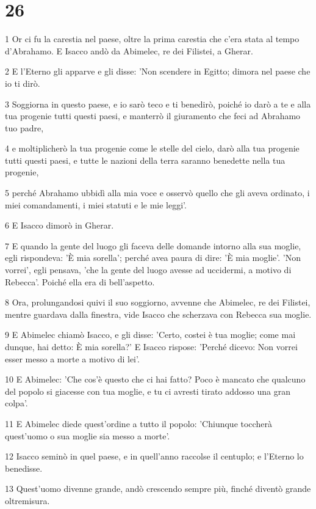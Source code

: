 \chapter{26}

\par 1 Or ci fu la carestia nel paese, oltre la prima carestia che c'era stata al tempo d'Abrahamo. E Isacco andò da Abimelec, re dei Filistei, a Gherar.
\par 2 E l'Eterno gli apparve e gli disse: 'Non scendere in Egitto; dimora nel paese che io ti dirò.
\par 3 Soggiorna in questo paese, e io sarò teco e ti benedirò, poiché io darò a te e alla tua progenie tutti questi paesi, e manterrò il giuramento che feci ad Abrahamo tuo padre,
\par 4 e moltiplicherò la tua progenie come le stelle del cielo, darò alla tua progenie tutti questi paesi, e tutte le nazioni della terra saranno benedette nella tua progenie,
\par 5 perché Abrahamo ubbidì alla mia voce e osservò quello che gli aveva ordinato, i miei comandamenti, i miei statuti e le mie leggi'.
\par 6 E Isacco dimorò in Gherar.
\par 7 E quando la gente del luogo gli faceva delle domande intorno alla sua moglie, egli rispondeva: 'È mia sorella'; perché avea paura di dire: 'È mia moglie'. 'Non vorrei', egli pensava, 'che la gente del luogo avesse ad uccidermi, a motivo di Rebecca'. Poiché ella era di bell'aspetto.
\par 8 Ora, prolungandosi quivi il suo soggiorno, avvenne che Abimelec, re dei Filistei, mentre guardava dalla finestra, vide Isacco che scherzava con Rebecca sua moglie.
\par 9 E Abimelec chiamò Isacco, e gli disse: 'Certo, costei è tua moglie; come mai dunque, hai detto: È mia sorella?' E Isacco rispose: 'Perché dicevo: Non vorrei esser messo a morte a motivo di lei'.
\par 10 E Abimelec: 'Che cos'è questo che ci hai fatto? Poco è mancato che qualcuno del popolo si giacesse con tua moglie, e tu ci avresti tirato addosso una gran colpa'.
\par 11 E Abimelec diede quest'ordine a tutto il popolo: 'Chiunque toccherà quest'uomo o sua moglie sia messo a morte'.
\par 12 Isacco seminò in quel paese, e in quell'anno raccolse il centuplo; e l'Eterno lo benedisse.
\par 13 Quest'uomo divenne grande, andò crescendo sempre più, finché diventò grande oltremisura.

